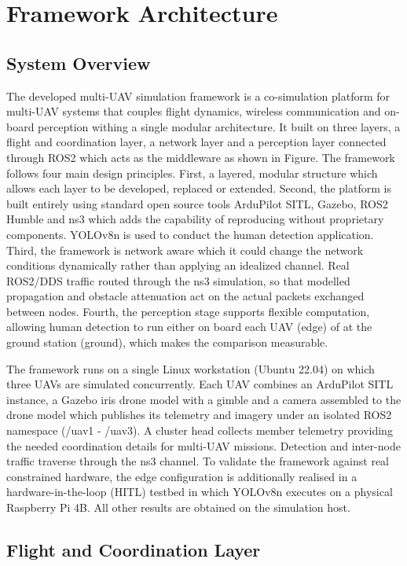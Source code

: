 \section{Framework Architecture}

\subsection{System Overview}

The developed multi-UAV simulation framework is a co-simulation platform for multi-UAV systems that couples flight dynamics, wireless communication and on-board perception withing a single modular architecture. It built on three layers, a flight and coordination layer, a network layer and a perception layer connected through ROS2 which acts as the middleware as shown in Figure. The framework follows four main design principles. First, a layered, modular structure which allows each layer to be developed, replaced or extended. Second, the platform is built entirely using standard open source tools ArduPilot SITL, Gazebo, ROS2 Humble and ns3 which adds the capability of reproducing without proprietary components. YOLOv8n is used to conduct the human detection application. Third, the framework is network aware which it could change the network conditions dynamically rather than applying an idealized channel. Real ROS2/DDS traffic routed through the ns3 simulation, so that modelled propagation and obstacle attenuation act on the actual packets exchanged between nodes. Fourth, the perception stage supports flexible computation, allowing human detection to run either on board each UAV (edge) of at the ground station (ground), which makes the comparison measurable. 

The framework runs on a single Linux workstation (Ubuntu 22.04) on which three UAVs are simulated concurrently. Each UAV combines an ArduPilot SITL instance, a Gazebo iris drone model with a gimble and a camera assembled to the drone model which publishes its telemetry and imagery under an isolated ROS2 namespace (/uav1 - /uav3). A cluster head collects member telemetry providing the needed coordination details for multi-UAV missions. Detection and inter-node traffic traverse through the ns3 channel. To validate the framework against real constrained hardware, the edge configuration is additionally realised in a hardware-in-the-loop (HITL) testbed in which YOLOv8n executes on a physical Raspberry Pi 4B. All other results are obtained on the simulation host.


\subsection{Flight and Coordination Layer}

